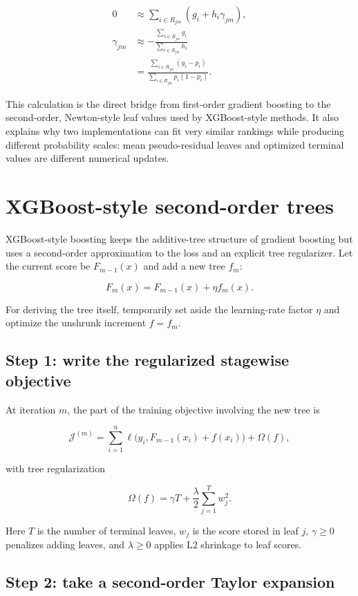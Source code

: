 \documentclass[11pt]{article}
\begin{document}
\begin{align*}
 0
 &\approx\sum_{i\in R_{jm}}(g_i+h_i\gamma_{jm}),\\
 \gamma_{jm}
 &\approx-\frac{\sum_{i\in R_{jm}}g_i}
 {\sum_{i\in R_{jm}}h_i}\\
 &=\frac{\sum_{i\in R_{jm}}(y_i-p_i)}
 {\sum_{i\in R_{jm}}p_i(1-p_i)}.
\end{align*}

This calculation is the direct bridge from first-order gradient boosting to the
second-order, Newton-style leaf values used by XGBoost-style methods. It also
explains why two implementations can fit very similar rankings while producing
different probability scales: mean pseudo-residual leaves and optimized
terminal values are different numerical updates.

\section{XGBoost-style second-order trees}

XGBoost-style boosting keeps the additive-tree structure of gradient boosting
but uses a second-order approximation to the loss and an explicit tree
regularizer. Let the current score be $F_{m-1}(x)$ and add a new tree $f_m$:

\[
 F_m(x)=F_{m-1}(x)+\eta f_m(x).
\]

For deriving the tree itself, temporarily set aside the learning-rate factor
$\eta$ and optimize the unshrunk increment $f=f_m$.

\subsection{Step 1: write the regularized stagewise objective}

At iteration $m$, the part of the training objective involving the new tree is

\[
 \mathcal J^{(m)}
 =\sum_{i=1}^n
 \ell\bigl(y_i,F_{m-1}(x_i)+f(x_i)\bigr)+\Omega(f),
\]

with tree regularization

\[
 \Omega(f)=\gamma T+\frac\lambda2\sum_{j=1}^T w_j^2.
\]

Here $T$ is the number of terminal leaves, $w_j$ is the score stored in leaf
$j$, $\gamma\ge0$ penalizes adding leaves, and $\lambda\ge0$ applies L2
shrinkage to leaf scores.

\subsection{Step 2: take a second-order Taylor expansion}
\end{document}

